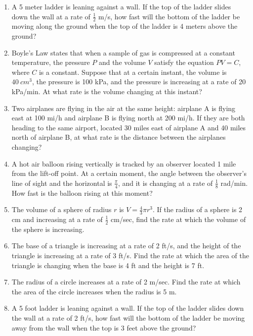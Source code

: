\documentclass[10pt]{scrartcl}
\theoremstyle{definition}
\begin{document}
\begin{enumerate}
\item[2023 Spring Exam 3 \#6] A 5 meter ladder is leaning against a wall. If the top of the ladder slides down the wall at a rate of $\frac12$ m/s, how fast will the bottom of the ladder be moving along the ground when the top of the ladder is 4 meters above the ground?
\item[2023 Spring Final \#14] Boyle's Law states that when a sample of gas is compressed at a constant temperature, the pressure $P$ and the volume $V$ satisfy the equation $PV = C$, where $C$ is a constant. Suppose that at a certain instant, the volume is $\SI{40}{cm^3}$, the pressure is 100 kPa, and the pressure is increasing at a rate of 20 kPa/min. At what rate is the volume changing at this instant?
\item[2022 Fall Exam 2 \#6] Two airplanes are flying in the air at the same height: airplane A is flying east at 100 mi/h and airplane B is flying north at 200 mi/h. If they are both heading to the same airport, located 30 miles east of airplane A and 40 miles north of airplane B, at what rate is the distance between the airplanes changing?
\item[2022 Spring Exam 2 \#5] A hot air balloon rising vertically is tracked by an observer located 1 mile from the lift-off point. At a certain moment, the angle between the observer's line of sight and the horizontal is $\tfrac\pi4$, and it is changing at a rate of $\tfrac{1}{8}$ rad/min. How fast is the balloon rising at this moment?
\item[2022 Spring Exam 2 \#9] The volume of a sphere of radius $r$ is $V = \frac43 \pi r^3$. If the radius of a sphere is 2 cm and increasing at a rate of $\tfrac12$ cm/sec, find the rate at which the volume of the sphere is increasing.
\item[2022 Spring Final \#14] The base of a triangle is increasing at a rate of 2 ft/s, and the height of the triangle is increasing at a rate of 3 ft/s. Find the rate at which the area of the triangle is changing when the base is 4 ft and the height is 7 ft.
\item[2021 Fall Final \#8] The radius of a circle increases at a rate of 2 m/sec. Find the rate at which the area of the circle increases when the radius is 5 m.
\item[2019 Fall Exam 2 \#3] A 5 foot ladder is leaning against a wall. If the top of the ladder slides down the wall at a rate of 2 ft/s, how fast will the bottom of the ladder be moving away from the wall when the top is 3 feet above the ground?

\end{enumerate}
\end{document}

